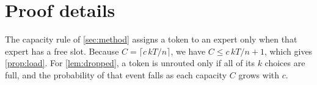\section{Proof details}
\label{app:proof}

The capacity rule of \cref{sec:method} assigns a token to an expert only when that expert has a free slot.
Because $C = \lceil c\,kT/n \rceil$, we have $C \le c\,kT/n + 1$, which gives \cref{prop:load}.
For \cref{lem:dropped}, a token is unrouted only if all of its $k$ choices are full, and the probability of that event falls as each capacity $C$ grows with $c$.
